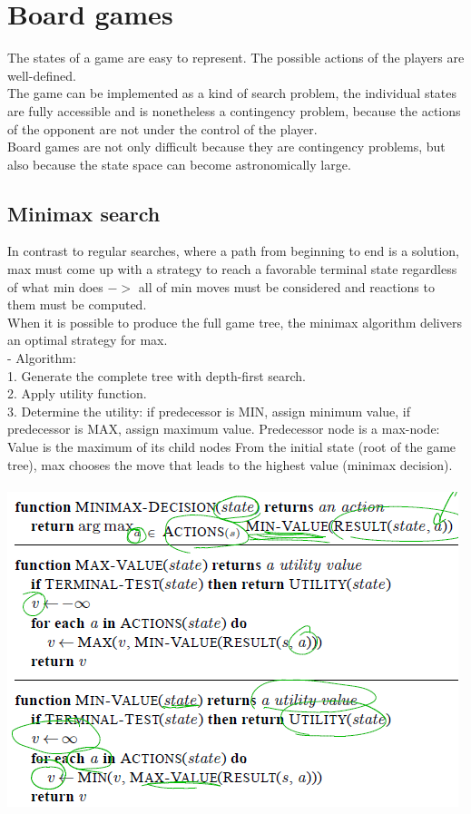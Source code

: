 \documentclass{article}
\begin{document}
\section{Board games}
The states of a game are easy to represent. The possible actions of the players are well-defined.\\
The game can be implemented as a kind of search problem, the individual states are fully accessible and is nonetheless a contingency problem, because the actions of the opponent are not under the control of the player.\\
Board games are not only difficult because they are contingency problems, but also because the state space can become astronomically large.\\
\subsection{Minimax search}
In contrast to regular searches, where a path from beginning to end is a solution, max must come up with a strategy to reach a favorable terminal state regardless of what min does $->$ all of min moves must be considered and reactions to them must be computed.\\
When it is possible to produce the full game tree, the minimax algorithm delivers an optimal strategy for max.\\
- Algorithm:\\
1. Generate the complete tree with depth-first search.\\
2. Apply utility function.\\
3. Determine the utility: if predecessor is MIN, assign minimum value, if predecessor is MAX, assign maximum value.
Predecessor node is a max-node: Value is the maximum of its child nodes
From the initial state (root of the game tree), max chooses the move that
leads to the highest value (minimax decision).\\\\
\includegraphics[scale=0.6]{21.png}
\end{document}
